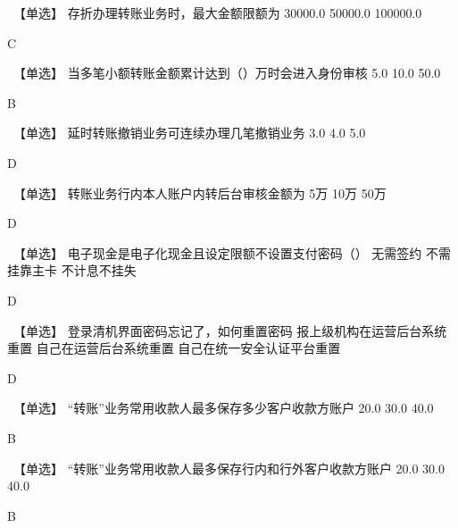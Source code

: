 \documentclass[kindlepaper]{BHCexam4kindle}
\begin{document}
\begin{questions}
\qs　【单选】 存折办理转账业务时，最大金额限额为 \xx
{} {  30000.0 } { 50000.0 } { 100000.0 }
\begin{solution} C \end{solution}
\qs　【单选】 当多笔小额转账金额累计达到（）万时会进入身份审核 \xx
{} {  5.0 } { 10.0 } { 50.0 }
\begin{solution} B \end{solution}
\qs　【单选】 延时转账撤销业务可连续办理几笔撤销业务 \xx
{} {  3.0 } { 4.0 } { 5.0 }
\begin{solution} D \end{solution}
\qs　【单选】 转账业务行内本人账户内转后台审核金额为 \xx
{} {  5万 } { 10万 } { 50万 }
\begin{solution} D \end{solution}
\qs　【单选】 电子现金是电子化现金且设定限额不设置支付密码（） \xx
{} {  无需签约 } { 不需挂靠主卡 } { 不计息不挂失 }
\begin{solution} D \end{solution}
\qs　【单选】 登录清机界面密码忘记了，如何重置密码 \xx
{} {  报上级机构在运营后台系统重置 } { 自己在运营后台系统重置 } { 自己在统一安全认证平台重置 }
\begin{solution} D \end{solution}
\qs　【单选】 “转账”业务常用收款人最多保存多少客户收款方账户 \xx
{} {  20.0 } { 30.0 } { 40.0 }
\begin{solution} B \end{solution}
\qs　【单选】 “转账”业务常用收款人最多保存行内和行外客户收款方账户 \xx
{} {  20.0 } { 30.0 } { 40.0 }
\begin{solution} B \end{solution}

\end{questions}
\end{document}

